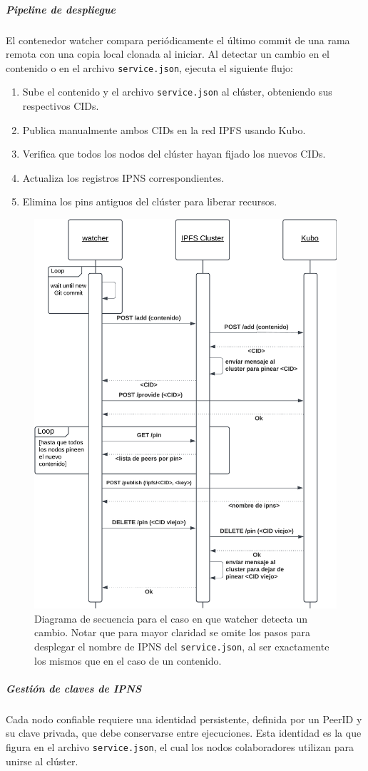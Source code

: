\subparagraph{Pipeline de despliegue} El contenedor watcher compara periódicamente el último commit de una rama remota con una copia local clonada al iniciar. Al detectar un cambio en el contenido o en el archivo \texttt{service.json}, ejecuta el siguiente flujo:
\begin{enumerate}
    \item Sube el contenido y el archivo \texttt{service.json} al clúster, obteniendo sus respectivos CIDs.
    \item Publica manualmente ambos CIDs en la red IPFS usando Kubo.
    \item Verifica que todos los nodos del clúster hayan fijado los nuevos CIDs.
    \item Actualiza los registros IPNS correspondientes.
    \item Elimina los pins antiguos del clúster para liberar recursos.
\end{enumerate}

\begin{figure}[H]
    \centering
    \includegraphics[width=0.5\linewidth]{img/solucion-ipfs/ds-trusted-peer.png}
    \caption{Diagrama de secuencia para el caso en que watcher detecta un cambio. Notar que para mayor claridad se omite los pasos para desplegar el nombre de IPNS del \texttt{service.json}, al ser exactamente los mismos que en el caso de un contenido.}
    \label{fig:contenedores-trusted-peer}
\end{figure}

\subparagraph{Gestión de claves de IPNS}

Cada nodo confiable requiere una identidad persistente, definida por un PeerID y su clave privada, que debe conservarse entre ejecuciones. Esta identidad es la que figura en el archivo \texttt{service.json}, el cual los nodos colaboradores utilizan para unirse al clúster.


